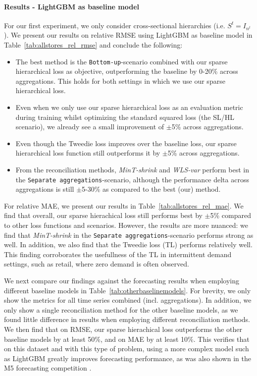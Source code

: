 \documentclass[preprint, 3p, times, twocolumn]{elsarticle}
\begin{document}
  \paragraph{Results - LightGBM as baseline model} For our first experiment, we only consider cross-sectional hierarchies (i.e. \(S^t = I_{n^t}\)). We present our results on relative RMSE using LightGBM as baseline model in Table~\ref{tab:allstores_rel_rmse} and conclude the following:
  \begin{itemize}
    \item The best method is the \texttt{Bottom-up}-scenario combined with our sparse hierarchical loss as objective, outperforming the baseline by 0-20\% across aggregations. This holds for both settings in which we use our sparse hierarchical loss.
    \item Even when we only use our sparse hierarchical loss as an evaluation metric during training whilst optimizing the standard squared loss (the SL/HL scenario), we already see a small improvement of $\pm$5\% across aggregations. 
    \item Even though the Tweedie loss improves over the baseline loss, our sparse hierarchical loss function still outperforms it by $\pm$5\% across aggregations.
    \item From the reconciliation methods, \textit{MinT-shrink} and \textit{WLS-var} perform best in the \texttt{Separate aggregations}-scenario, although the performance delta across aggregations is still $\pm$5-30\% as compared to the best (our) method.
  \end{itemize}
  For relative MAE, we present our results in Table~\ref{tab:allstores_rel_mae}. We find that overall, our sparse hierachical loss still performs best by $\pm$5\% compared to other loss functions and scenarios. However, the results are more nuanced: we find that \textit{MinT-shrink} in the \texttt{Separate aggregations}-scenario performs strong as well. In addition, we also find that the Tweedie loss (TL) performs relatively well. This finding corroborates the usefullness of the TL in intermittent demand settings, such as retail, where zero demand is often observed.

  We next compare our findings against the forecasting results when employing different baseline models in Table~\ref{tab:otherbaselinemodels}. For brevity, we only show the metrics for all time series combined (incl. aggregations). In addition, we only show a single reconciliation method for the other baseline models, as we found little difference in results when employing different reconciliation methods. We then find that on RMSE, our sparse hierachical loss outperforms the other baseline models by at least 50\%, and on MAE by at least 10\%. This verifies that on this dataset and with this type of problem, using a more complex model such as LightGBM greatly improves forecasting performance, as was also shown in the M5 forecasting competition \cite{makridakis_m5_2020}.
\end{document}
